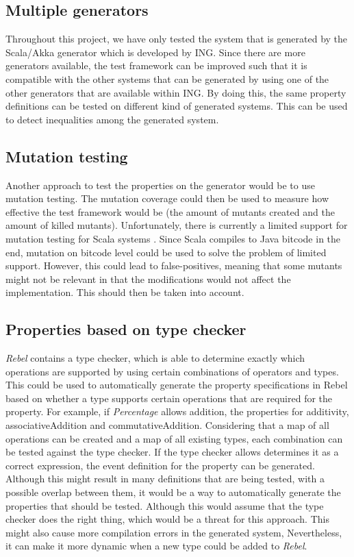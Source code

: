 \subsection*{Multiple generators}
Throughout this project, we have only tested the system that is generated by the Scala/Akka generator which is developed by ING. Since there are more generators available, the test framework can be improved such that it is compatible with the other systems that can be generated by using one of the other generators that are available within ING. By doing this, the same property definitions can be tested on different kind of generated systems. This can be used to detect inequalities among the generated system.

\subsection*{Mutation testing}
Another approach to test the properties on the generator would be to use mutation testing. The mutation coverage could then be used to measure how effective the test framework would be (the amount of mutants created and the amount of killed mutants). Unfortunately, there is currently a limited support for mutation testing for Scala systems . Since Scala compiles to Java bitcode in the end, mutation on bitcode level could be used to solve the problem of limited support. However, this could lead to false-positives, meaning that some mutants might not be relevant in that the modifications would not affect the implementation. This should then be taken into account. 

\subsection*{Properties based on type checker}
\textit{Rebel} contains a type checker, which is able to determine exactly which operations are supported by using certain combinations of operators and types. This could be used to automatically generate the property specifications in Rebel based on whether a type supports certain operations that are required for the property. For example, if \textit{Percentage} allows addition, the properties for additivity, associativeAddition and commutativeAddition. Considering that a map of all operations can be created and a map of all existing types, each combination can be tested against the type checker. If the type checker allows determines it as a correct expression, the event definition for the property can be generated. Although this might result in many definitions that are being tested, with a possible overlap between them, it would be a way to automatically generate the properties that should be tested. Although this would assume that the type checker does the right thing, which would be a threat for this approach. This might also cause more compilation errors in the generated system, Nevertheless, it can make it more dynamic when a new type could be added to \textit{Rebel}.
